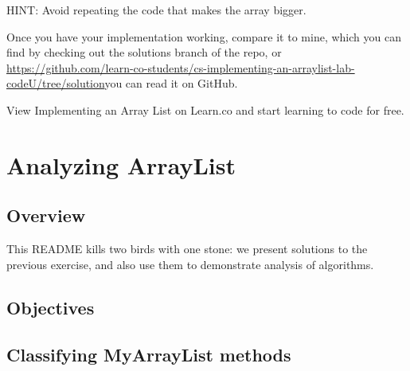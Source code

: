 \documentclass[12pt]{book}
\theoremstyle{exercise}
\newcommand{\java}{\verb}%}
\begin{document}
HINT: Avoid repeating the code that makes the array bigger.


Once you have your implementation working, compare it to mine, which you
can find by checking out the solutions branch of the repo, or
\url{https://github.com/learn-co-students/cs-implementing-an-arraylist-lab-codeU/tree/solution}{you
can read it on GitHub}.

View Implementing an Array List on Learn.co and start learning to code
for free.

\chapter{Analyzing ArrayList}
\label{cs-analyzing-our-arraylist-readme}

\section{Overview}\label{overview-2}

This README kills two birds with one stone: we present solutions to the
previous exercise, and also use them to demonstrate analysis of algorithms.

\section{Objectives}\label{objectives-4}


\section{Classifying MyArrayList
methods}\label{classifying-myarraylist-methods}
\end{document}
